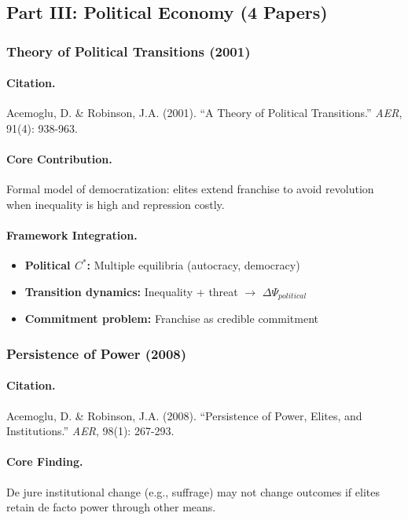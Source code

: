 \subsection{Part III: Political Economy (4 Papers)}

\subsubsection{Theory of Political Transitions (2001)}

\paragraph{Citation.}
Acemoglu, D. \& Robinson, J.A. (2001).
``A Theory of Political Transitions.'' \emph{AER}, 91(4): 938-963.

\paragraph{Core Contribution.}
Formal model of democratization: elites extend franchise to avoid
revolution when inequality is high and repression costly.

\paragraph{Framework Integration.}
\begin{itemize}
  \item \textbf{Political $C^*$:} Multiple equilibria (autocracy, democracy)
  \item \textbf{Transition dynamics:} Inequality + threat $\to$ $\Delta\Psi_{political}$
  \item \textbf{Commitment problem:} Franchise as credible commitment
\end{itemize}

\subsubsection{Persistence of Power (2008)}

\paragraph{Citation.}
Acemoglu, D. \& Robinson, J.A. (2008).
``Persistence of Power, Elites, and Institutions.'' \emph{AER}, 98(1): 267-293.

\paragraph{Core Finding.}
De jure institutional change (e.g., suffrage) may not change outcomes
if elites retain de facto power through other means.

